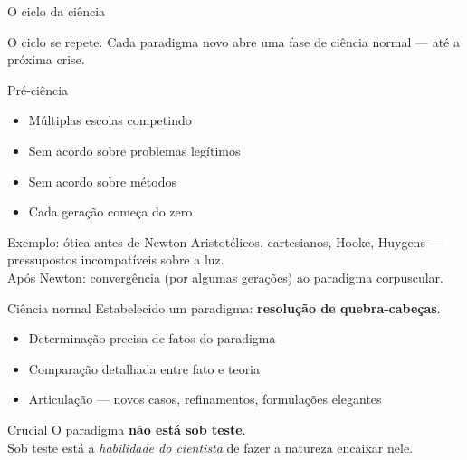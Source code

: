\documentclass[aspectratio=169]{beamer}
\newcommand{\impt}[1]{\textcolor{maccent}{\textbf{#1}}}
\newcommand{\ntc}[1]{\textcolor{mprimary}{#1}}
\begin{document}
\begin{frame}{O ciclo da ciência}
\vspace{0.3cm}
\begin{center}
\end{center}
\vspace{0.3cm}
\pause
\ntc{O ciclo se repete.} Cada paradigma novo abre uma fase de ciência normal --- até a próxima crise.
\end{frame}

\begin{frame}{Pré-ciência}
\begin{itemize}
  \item Múltiplas escolas competindo
  \item Sem acordo sobre problemas legítimos
  \item Sem acordo sobre métodos
  \item Cada geração começa do zero
\end{itemize}
\vspace{0.4cm}
\pause
\begin{block}{Exemplo: ótica antes de Newton}
Aristotélicos, cartesianos, Hooke, Huygens --- pressupostos incompatíveis sobre a luz. \\
Após Newton: convergência (por algumas gerações) ao paradigma corpuscular.
\end{block}
\end{frame}

\begin{frame}{Ciência normal}
Estabelecido um paradigma: \impt{resolução de quebra-cabeças}.
\vspace{0.3cm}
\pause
\begin{itemize}
  \item Determinação precisa de fatos do paradigma
  \pause
  \item Comparação detalhada entre fato e teoria
  \pause
  \item Articulação --- novos casos, refinamentos, formulações elegantes
\end{itemize}
\vspace{0.4cm}
\pause
\begin{alertblock}{Crucial}
O paradigma \impt{não está sob teste}. \\
Sob teste está a \emph{habilidade do cientista} de fazer a natureza encaixar nele.
\end{alertblock}
\end{frame}
\end{document}
